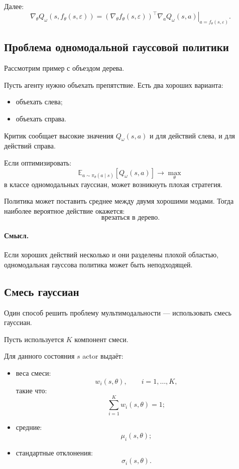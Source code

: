 \documentclass[12pt,a4paper]{article}
\begin{document}
Далее:
\[
\nabla_\theta
Q_\omega
\left(
s,
f_\theta(s,\varepsilon)
\right)
=
\left(
\nabla_\theta f_\theta(s,\varepsilon)
\right)^\top
\left.
\nabla_a Q_\omega(s,a)
\right|_{a=f_\theta(s,\varepsilon)}.
\]

\subsection{Проблема одномодальной гауссовой политики}

Рассмотрим пример с объездом дерева.

Пусть агенту нужно объехать препятствие. Есть два хороших варианта:

\begin{itemize}
    \item объехать слева;
    \item объехать справа.
\end{itemize}

Критик сообщает высокие значения $Q_\omega(s,a)$ и для действий слева, и для действий справа.

Если оптимизировать:
\[
\mathbb E_{a\sim\pi_\theta(a\mid s)}
\left[
Q_\omega(s,a)
\right]
\to
\max_\theta
\]
в классе одномодальных гауссиан, может возникнуть плохая стратегия.

Политика может поставить среднее между двумя хорошими модами. Тогда наиболее вероятное действие окажется:
\[
\text{врезаться в дерево}.
\]

\paragraph{Смысл.}

Если хороших действий несколько и они разделены плохой областью, одномодальная гауссова политика может быть неподходящей.

\subsection{Смесь гауссиан}

Один способ решить проблему мультимодальности --- использовать смесь гауссиан.

Пусть используется $K$ компонент смеси.

Для данного состояния $s$ actor выдаёт:

\begin{itemize}
    \item веса смеси:
    \[
    w_i(s,\theta),
    \qquad
    i=1,\ldots,K,
    \]
    такие что:
    \[
    \sum_{i=1}^{K} w_i(s,\theta)=1;
    \]

    \item средние:
    \[
    \mu_i(s,\theta);
    \]

    \item стандартные отклонения:
    \[
    \sigma_i(s,\theta).
    \]
\end{itemize}
\end{document}
